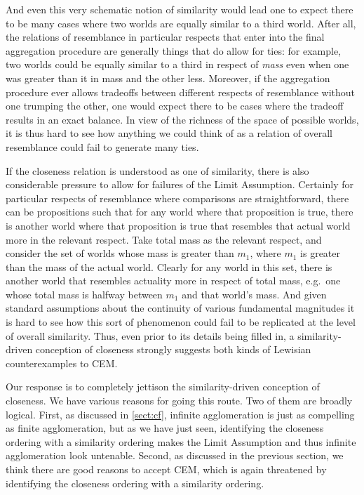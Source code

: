 \documentclass[If.tex]{subfiles}
\begin{document}
And even this very schematic notion of similarity would lead one to expect there to be many cases where two worlds are equally similar to a third world. After all, the relations of resemblance in particular respects that enter into the final aggregation procedure are generally things that do allow for ties: for example, two worlds could be equally similar to a third in respect of \emph{mass} even when one was greater than it in mass and the other less. Moreover, if the aggregation procedure ever allows tradeoffs between different respects of resemblance without one trumping the other, one would expect there to be cases where the tradeoff results in an exact balance. In view of the richness of the space of possible worlds, it is thus hard to see how anything we could think of as a relation of overall resemblance could fail to generate many ties.

If the closeness relation is understood as one of similarity, there is also considerable pressure to allow for failures of the Limit Assumption. Certainly for particular respects of resemblance where comparisons are straightforward, there can be propositions such that for any world where that proposition is true, there is another world where that proposition is true that resembles that actual world more in the relevant respect. Take total mass as the relevant respect, and consider the set of worlds whose mass is greater than $m_1$, where $m_1$ is greater than the mass of the actual world. Clearly for any world in this set, there is another world that resembles actuality more in respect of total mass, e.g.~one whose total mass is halfway between $m_1$ and that world's mass. And given standard assumptions about the continuity of various fundamental magnitudes it is hard to see how this sort of phenomenon could fail to be replicated at the level of overall similarity. Thus, even prior to its details being filled in, a similarity-driven conception of closeness strongly suggests both kinds of Lewisian counterexamples to CEM.

Our response is to completely jettison the similarity-driven conception of closeness. We have various reasons for going this route. Two of them are broadly logical. First, as discussed in \autoref{sect:cf}, infinite agglomeration is just as compelling as finite agglomeration, but as we have just seen, identifying the closeness ordering with a similarity ordering makes the Limit Assumption and thus infinite agglomeration look untenable. Second, as discussed in the previous section, we think there are good reasons to accept CEM, which is again threatened by identifying the closeness ordering with a similarity ordering. 
\end{document}

